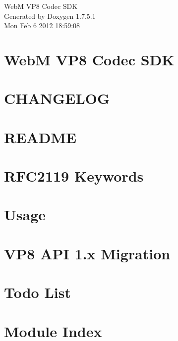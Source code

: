 \documentclass[letterpaper]{article}
\begin{document}
\hypersetup{pageanchor=false,citecolor=blue}
\begin{titlepage}
\vspace*{7cm}
\begin{center}
{\Large \-Web\-M \-V\-P8 \-Codec \-S\-D\-K }\\
\vspace*{1cm}
{\large \-Generated by Doxygen 1.7.5.1}\\
\vspace*{0.5cm}
{\small Mon Feb 6 2012 18:59:08}\\
\end{center}
\end{titlepage}
\tableofcontents
{}
\hypersetup{pageanchor=true,citecolor=blue}
\section{\-Web\-M \-V\-P8 \-Codec \-S\-D\-K}
\label{index}\hypertarget{index}{}
\section{\-C\-H\-A\-N\-G\-E\-L\-O\-G}
\label{changelog}
\hypertarget{changelog}{}

\section{\-R\-E\-A\-D\-M\-E}
\label{readme}
\hypertarget{readme}{}

\section{\-R\-F\-C2119 \-Keywords}
\label{rfc2119}
\hypertarget{rfc2119}{}

\section{\-Usage}
\label{usage}
\hypertarget{usage}{}

\section{\-V\-P8 \-A\-P\-I 1.x \-Migration}
\label{vp8_api1_migration}
\hypertarget{vp8_api1_migration}{}

\section{\-Todo \-List}
\label{todo}
\hypertarget{todo}{}

\section{\-Module \-Index}

\end{document}
